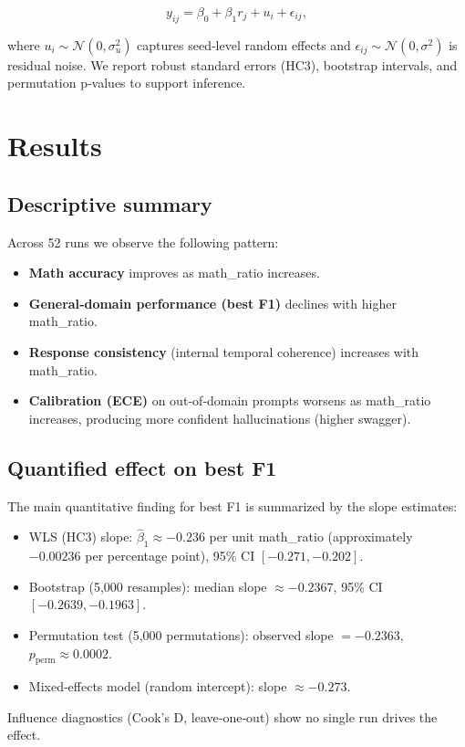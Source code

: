 \documentclass[11pt,a4paper]{article}
\begin{document}
\[
y_{ij} = \beta_0 + \beta_1 r_j + u_i + \epsilon_{ij},
\]

where \(u_i\sim\mathcal{N}(0,\sigma_u^2)\) captures seed‑level random effects and \(\epsilon_{ij}\sim\mathcal{N}(0,\sigma^2)\) is residual noise. We report robust standard errors (HC3), bootstrap intervals, and permutation p‑values to support inference.

\section{Results}
\subsection{Descriptive summary}
Across 52 runs we observe the following pattern:
\begin{itemize}[noitemsep]
  \item \textbf{Math accuracy} improves as math\_ratio increases.
  \item \textbf{General‑domain performance (best F1)} declines with higher math\_ratio.
  \item \textbf{Response consistency} (internal temporal coherence) increases with math\_ratio.
  \item \textbf{Calibration (ECE)} on out‑of‑domain prompts worsens as math\_ratio increases, producing more confident hallucinations (higher swagger).
\end{itemize}

\subsection{Quantified effect on best F1}
The main quantitative finding for best F1 is summarized by the slope estimates:
\begin{itemize}[noitemsep]
  \item WLS (HC3) slope: \(\hat\beta_1 \approx -0.236\) per unit math\_ratio (approximately \(-0.00236\) per percentage point), 95\% CI \([-0.271,-0.202]\).
  \item Bootstrap (5,000 resamples): median slope \(\approx -0.2367\), 95\% CI \([-0.2639,-0.1963]\).
  \item Permutation test (5,000 permutations): observed slope \(= -0.2363\), \(p_{\text{perm}}\approx 0.0002\).
  \item Mixed‑effects model (random intercept): slope \(\approx -0.273\).
\end{itemize}
Influence diagnostics (Cook's D, leave‑one‑out) show no single run drives the effect.
\end{document}

